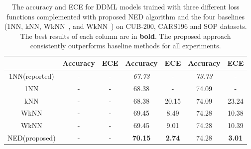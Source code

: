 \documentclass{article}
\begin{document}
\begin{table*}[h]
\begin{center}
\begin{tabular}{|c|c|c|c|c|c|c|}
			\hline
			& Accuracy & ECE & Accuracy & ECE  & Accuracy & ECE   \\
			\hline
			1NN(reported) & - & - & \emph{67.73} & - & \emph{73.73} & -  \\
			\hline
			1NN & - & - & 68.38 & - &  74.09 & -  \\
			\hline
			kNN & - & - & 68.38 & 20.15 &74.09 &  23.24  \\
			\hline
			WkNN \cite{b70} & - & - &  69.45& 8.49 & 74.28  &  10.38  \\
			\hline
			WkNN \cite{b69} & - & - &   69.45 &9.01&74.28 &  10.39  \\
			\hline
			NED(proposed) & - & -  & \textbf{70.15} & \textbf{2.74} & 74.28 & \textbf{3.01}  \\
			\hline
		\end{tabular}
		\caption{The accuracy and ECE for DDML models trained with three different loss functions complemented with proposed NED algorithm and the four baselines (1NN, kNN, WkNN~\cite{b70}, and WkNN~\cite{b69}) on CUB-200, CARS196 and SOP datasets.  The best results of each column are in \textbf{bold}. The proposed approach consistently outperforms baseline methods for all experiments. }
		\label{tab:best_retreival_preformance}
	\end{center}
\end{table*}
\end{document}
